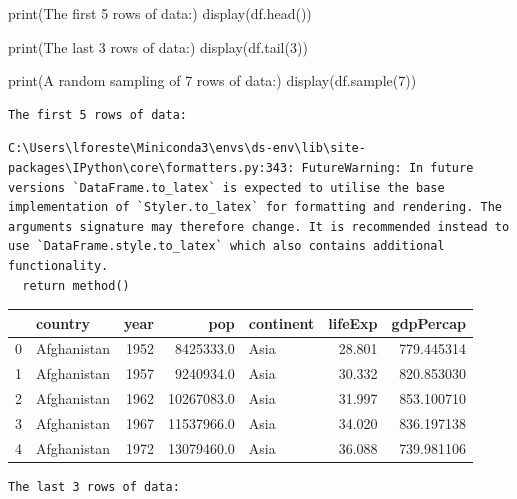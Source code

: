 \documentclass[
  letterpaper,
  DIV=11,
  numbers=noendperiod]{scrreprt}
\newenvironment{Shaded}{\begin{snugshade}}{\end{snugshade}}
\newcommand{\BuiltInTok}[1]{\textcolor[rgb]{0.00,0.23,0.31}{#1}}
\newcommand{\DecValTok}[1]{\textcolor[rgb]{0.68,0.00,0.00}{#1}}
\newcommand{\NormalTok}[1]{\textcolor[rgb]{0.00,0.23,0.31}{#1}}
\newcommand{\StringTok}[1]{\textcolor[rgb]{0.13,0.47,0.30}{#1}}
\begin{document}
\begin{Shaded}
\begin{Highlighting}[]
\BuiltInTok{print}\NormalTok{(}\StringTok{\textquotesingle{}The first 5 rows of data:\textquotesingle{}}\NormalTok{)}
\NormalTok{display(df.head())}

\BuiltInTok{print}\NormalTok{(}\StringTok{\textquotesingle{}The last 3 rows of data:\textquotesingle{}}\NormalTok{)}
\NormalTok{display(df.tail(}\DecValTok{3}\NormalTok{))}

\BuiltInTok{print}\NormalTok{(}\StringTok{\textquotesingle{}A random sampling of 7 rows of data:\textquotesingle{}}\NormalTok{)}
\NormalTok{display(df.sample(}\DecValTok{7}\NormalTok{))}
\end{Highlighting}
\end{Shaded}

\begin{verbatim}
The first 5 rows of data:
\end{verbatim}

\begin{verbatim}
C:\Users\lforeste\Miniconda3\envs\ds-env\lib\site-packages\IPython\core\formatters.py:343: FutureWarning: In future versions `DataFrame.to_latex` is expected to utilise the base implementation of `Styler.to_latex` for formatting and rendering. The arguments signature may therefore change. It is recommended instead to use `DataFrame.style.to_latex` which also contains additional functionality.
  return method()
\end{verbatim}

\begin{tabular}{llrrlrr}
\toprule
{} &      country &  year &         pop & continent &  lifeExp &   gdpPercap \\
\midrule
0 &  Afghanistan &  1952 &   8425333.0 &      Asia &   28.801 &  779.445314 \\
1 &  Afghanistan &  1957 &   9240934.0 &      Asia &   30.332 &  820.853030 \\
2 &  Afghanistan &  1962 &  10267083.0 &      Asia &   31.997 &  853.100710 \\
3 &  Afghanistan &  1967 &  11537966.0 &      Asia &   34.020 &  836.197138 \\
4 &  Afghanistan &  1972 &  13079460.0 &      Asia &   36.088 &  739.981106 \\
\bottomrule
\end{tabular}

\begin{verbatim}
The last 3 rows of data:
\end{verbatim}
\end{document}
